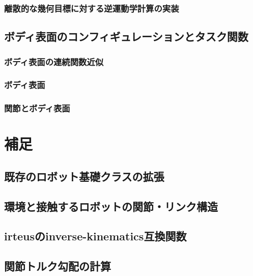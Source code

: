 \documentclass[]{jarticle}
\begin{document}
\subsubsection{離散的な幾何目標に対する逆運動学計算の実装}

\subsection{ボディ表面のコンフィギュレーションとタスク関数} \label{sec:body-surface}
\subsubsection{ボディ表面の連続関数近似}

\subsubsection{ボディ表面}

\subsubsection{関節とボディ表面}


\section{補足} \label{chap:appendix}
\subsection{既存のロボット基礎クラスの拡張} \label{sec:base-extention}

\subsection{環境と接触するロボットの関節・リンク構造} \label{sec:robot-environment}


\subsection{irteusのinverse-kinematics互換関数} \label{sec:ik-wrapper}

\subsection{関節トルク勾配の計算} \label{sec:torque-jacobian}

\end{document}
